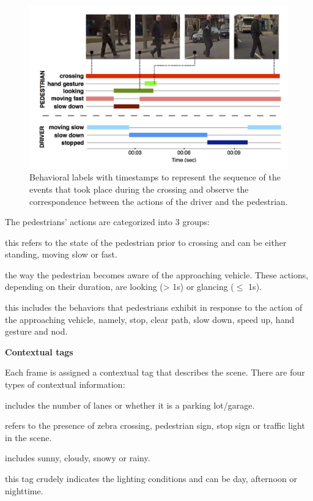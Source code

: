 \begin{figure}[h!]
  \centering
  \includegraphics[width=0.6\linewidth]{ExpAndDiss/jaad_behavior_label.png}
  \caption{Behavioral labels with timestamps to represent the sequence of the events that took place during the crossing and observe
           the correspondence between the actions of the driver and the pedestrian. \cite{rasouli2017they}}
  \label{fig:jaad_bahavior_label}
\end{figure}

The pedestrians’ actions are categorized into 3 groups: 

\begin{description}[leftmargin=0in, labelindent=0pt]
\item[Precondition] this refers to the state of the pedestrian prior to crossing and can be either standing, moving slow or fast.

\item[Attention] the way the pedestrian becomes aware of the approaching vehicle. These actions, depending on their duration, are looking (> 1s) or glancing ($\leq$ 1s).

\item[Response] this includes the behaviors that pedestrians exhibit in response to the action of the approaching vehicle, namely, stop, clear path, slow down, speed up, hand gesture and nod. 
\end{description}

\textbf{Contextual tags}

Each frame is assigned a contextual tag that describes the scene. There are four types of contextual information: 

\begin{description}[leftmargin=0in, labelindent=0pt]
\item[Configuration] includes the number of lanes or whether it is a parking lot/garage.

\item[Traffic signals] refers to the presence of zebra crossing, pedestrian sign, stop sign or traffic light in the scene.

\item[Weather] includes sunny, cloudy, snowy or rainy.

\item[Time of day] this tag crudely indicates the lighting conditions and can be day, afternoon or nighttime.
\end{description}

